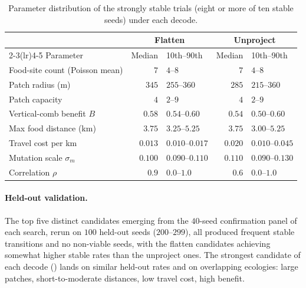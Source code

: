 \documentclass[11pt]{article}
\begin{document}
\begin{table}
  \centering
  \small
  \begin{tabular}{lrlrl}
    \toprule
    & \multicolumn{2}{c}{Flatten} & \multicolumn{2}{c}{Unproject} \\
    \cmidrule(lr){2-3}\cmidrule(lr){4-5}
    Parameter & Median & 10th--90th & Median & 10th--90th \\
    \midrule
    Food-site count (Poisson mean) & $7$    & $4$--$8$   & $7$    & $4$--$8$ \\
    Patch radius (m)               & $345$  & $255$--$360$ & $285$  & $215$--$360$ \\
    Patch capacity                 & $4$    & $2$--$9$   & $4$    & $2$--$9$ \\
    Vertical-comb benefit $B$      & $0.58$ & $0.54$--$0.60$ & $0.54$ & $0.50$--$0.60$ \\
    Max food distance (km)         & $3.75$ & $3.25$--$5.25$ & $3.75$ & $3.00$--$5.25$ \\
    Travel cost per km             & $0.013$ & $0.010$--$0.017$ & $0.020$ & $0.010$--$0.045$ \\
    Mutation scale $\sigma_m$      & $0.100$ & $0.090$--$0.110$ & $0.110$ & $0.090$--$0.130$ \\
    Correlation $\rho$             & $0.9$   & $0.0$--$1.0$ & $0.6$   & $0.0$--$1.0$ \\
    \bottomrule
  \end{tabular}
  \caption{Parameter distribution of the strongly stable trials (eight or more of
    ten stable seeds) under each decode.}
  \label{tab:optuna-region}
\end{table}

\paragraph{Held-out validation.}
The top five distinct candidates emerging from the $40$-seed confirmation
panel of each search, rerun on $100$ held-out seeds
($200$--$299$), all produced frequent stable transitions and no non-viable seeds,
with the flatten candidates achieving somewhat higher stable rates than the
unproject ones. The strongest candidate of each decode () lands
on similar held-out rates and on overlapping ecologies: large patches,
short-to-moderate distances, low travel cost, high benefit.
\end{document}
